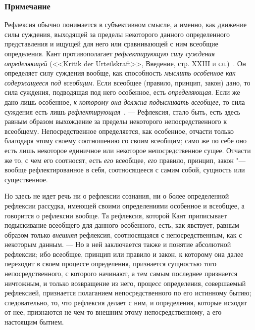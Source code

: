 \subsubsection[Примечание]{Примечание}

Рефлексия обычно понимается в субъективном смысле, а именно, как движение
силы суждения, выходящей за пределы некоторого данного определенного
представления и ищущей для него или сравнивающей с ним всеобщие
определения. Кант противополагает {\em рефлектирующую
силу суждения определяющей} (<<Kritik der Urteilskraft>>, Введение, стр.
XXIII и сл.)~.
Он определяет силу суждения вообще, как способность
{\em мыслить особенное как содержащееся под всеобщим}.
Если всеобщее (правило, принцип, закон) дано, то сила суждения, подводящая
под него особенное, есть {\em определяющая}. Если же
дано лишь особенное, {\em к которому она должна
подыскивать всеобщее}, то сила суждения есть лишь
{\em рефлектирующая}~.
--- Рефлексия, стало быть, есть здесь равным образом выхождение за пределы
некоторого непосредственного к всеобщему. Непосредственное определяется,
как особенное, отчасти только благодаря этому своему соотношению со своим
всеобщим; само же по себе оно есть лишь некоторое единичное или некоторое
непосредственное сущее. Отчасти же то, с чем его соотносят, есть
{\em его} всеобщее, {\em его}
правило, принцип, закон "--- вообще рефлектированное в себя, соотносящееся с
самим собой, сущность или существенное.

Но здесь не идет речь ни о рефлексии сознания, ни о более определенной
рефлексии рассудка, имеющей своими определениями особенное и всеобщее, а
говорится о рефлексии вообще. Та рефлексия, которой Кант приписывает
подыскивание всеобщего для данного особенного, есть, как явствует, равным
образом только {\em внешняя} рефлексия, соотносящаяся с
непосредственным, как с некоторым данным. --- Но в ней заключается также и
понятие абсолютной рефлексии; ибо всеобщее, принцип или правило и закон, к
которому она далее переходит в своем процессе определения, признается
сущностью того непосредственного, с которого начинают, а тем самым
последнее признается ничтожным, и только возвращение из него, процесс
определения, совершаемый рефлексией, признается полаганием
непосредственного по его истинному бытию; следовательно, то, что рефлексия
делает с ним, и определения, которые исходят от нее, признаются не чем-то
внешним этому непосредственному, а его настоящим бытием.

